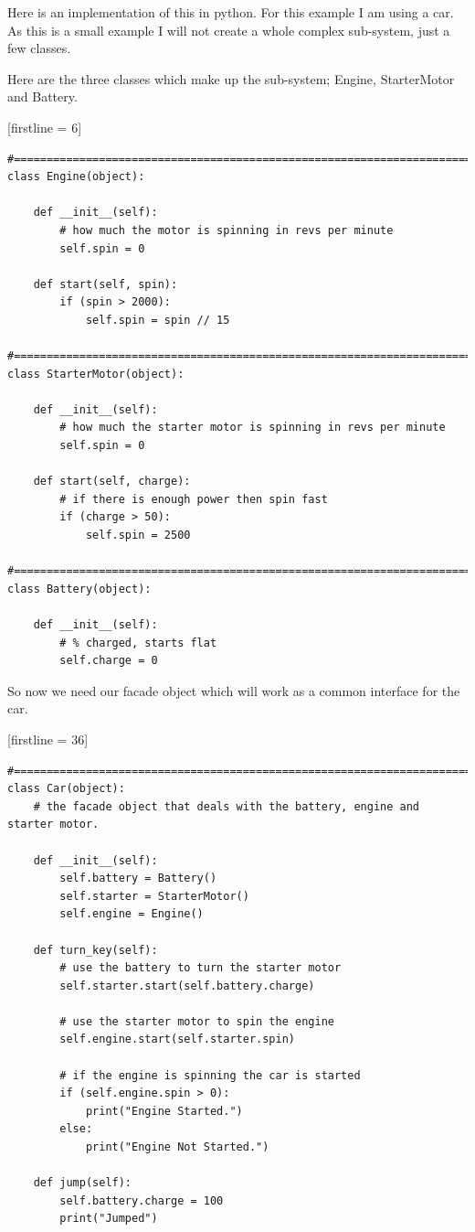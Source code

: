 \documentclass[12pt, oneside]{book} %
\begin{document}
Here is an implementation of this in python. For this example I am using a car. As this is a small example I will not create a whole complex sub-system, just a few classes.

Here are the three classes which make up the sub-system; Engine, StarterMotor and Battery.

[firstline = 6]
\begin{lstlisting}
#==============================================================================
class Engine(object):
    
    def __init__(self):
        # how much the motor is spinning in revs per minute
        self.spin = 0

    def start(self, spin):
        if (spin > 2000):
            self.spin = spin // 15

#==============================================================================
class StarterMotor(object):
    
    def __init__(self):
        # how much the starter motor is spinning in revs per minute
        self.spin = 0

    def start(self, charge):
        # if there is enough power then spin fast
        if (charge > 50):
            self.spin = 2500

#==============================================================================
class Battery(object):

    def __init__(self):
        # % charged, starts flat
        self.charge = 0
\end{lstlisting}

So now we need our facade object which will work as a common interface for the car.

[firstline = 36]
\begin{lstlisting}
#==============================================================================
class Car(object):
    # the facade object that deals with the battery, engine and starter motor.
    
    def __init__(self):
        self.battery = Battery()
        self.starter = StarterMotor()
        self.engine = Engine()
        
    def turn_key(self):
        # use the battery to turn the starter motor
        self.starter.start(self.battery.charge)

        # use the starter motor to spin the engine
        self.engine.start(self.starter.spin)
        
        # if the engine is spinning the car is started
        if (self.engine.spin > 0):
            print("Engine Started.")
        else:
            print("Engine Not Started.")

    def jump(self):
        self.battery.charge = 100
        print("Jumped")
\end{lstlisting}
\end{document}
